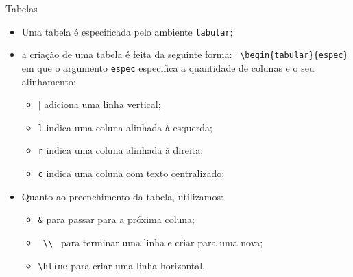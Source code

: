 \documentclass[c]{beamer}
\begin{document}
{\begin{frame}[fragile]{\sc Tabelas}
	\begin{itemize}
		\setlength\itemsep{0.3cm}
		\item Uma {\color{blue} tabela} é especificada pelo ambiente {\color{blue} \verb|tabular|};
		\item a criação de uma tabela é feita da seguinte forma:
		\verb| \begin{tabular}{espec} |\\
		em que o argumento {\color{blue} \verb|espec|} especifica a {\color{blue} quantidade de colunas} e o seu {\color{blue} alinhamento}:    
		\begin{itemize}
			\item $|$ adiciona uma linha vertical;
			\item \verb|l| indica uma coluna alinhada à esquerda;
			\item \verb|r| indica uma coluna alinhada à direita;
			\item \verb|c| indica uma coluna com texto centralizado;
		\end{itemize} 
		\item Quanto ao {\color{blue} preenchimento da tabela}, utilizamos:
		\begin{itemize}
			\item \verb|&| para passar para a próxima coluna;
			\item \verb| \\ | para terminar uma linha e criar para uma nova;
			\item \verb|\hline| para criar uma linha horizontal.
		\end{itemize} 
	\end{itemize}
\end{frame}



}
\end{document}
